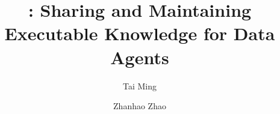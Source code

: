 


\title{\system: Sharing and Maintaining Executable Knowledge for Data Agents}

\author{Tai Ming}
\author{Zhanhao Zhao}



\maketitle

\vldbtopmatter











